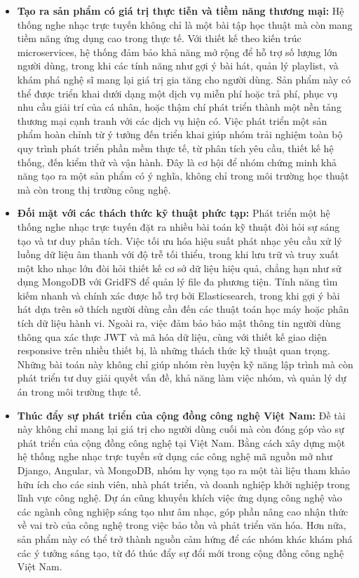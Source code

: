 \documentclass[a4paper,12pt]{report}
\begin{document}
\begin{itemize}
    \item \textbf{Tạo ra sản phẩm có giá trị thực tiễn và tiềm năng thương mại:}
    Hệ thống nghe nhạc trực tuyến không chỉ là một bài tập học thuật mà còn mang tiềm năng ứng dụng cao trong thực tế. Với thiết kế theo kiến trúc microservices, hệ thống đảm bảo khả năng mở rộng để hỗ trợ số lượng lớn người dùng, trong khi các tính năng như gợi ý bài hát, quản lý playlist, và khám phá nghệ sĩ mang lại giá trị gia tăng cho người dùng. Sản phẩm này có thể được triển khai dưới dạng một dịch vụ miễn phí hoặc trả phí, phục vụ nhu cầu giải trí của cá nhân, hoặc thậm chí phát triển thành một nền tảng thương mại cạnh tranh với các dịch vụ hiện có. Việc phát triển một sản phẩm hoàn chỉnh từ ý tưởng đến triển khai giúp nhóm trải nghiệm toàn bộ quy trình phát triển phần mềm thực tế, từ phân tích yêu cầu, thiết kế hệ thống, đến kiểm thử và vận hành. Đây là cơ hội để nhóm chứng minh khả năng tạo ra một sản phẩm có ý nghĩa, không chỉ trong môi trường học thuật mà còn trong thị trường công nghệ.

    \item \textbf{Đối mặt với các thách thức kỹ thuật phức tạp:}
    Phát triển một hệ thống nghe nhạc trực tuyến đặt ra nhiều bài toán kỹ thuật đòi hỏi sự sáng tạo và tư duy phân tích. Việc tối ưu hóa hiệu suất phát nhạc yêu cầu xử lý luồng dữ liệu âm thanh với độ trễ tối thiểu, trong khi lưu trữ và truy xuất một kho nhạc lớn đòi hỏi thiết kế cơ sở dữ liệu hiệu quả, chẳng hạn như sử dụng MongoDB với GridFS để quản lý file đa phương tiện. Tính năng tìm kiếm nhanh và chính xác được hỗ trợ bởi Elasticsearch, trong khi gợi ý bài hát dựa trên sở thích người dùng cần đến các thuật toán học máy hoặc phân tích dữ liệu hành vi. Ngoài ra, việc đảm bảo bảo mật thông tin người dùng thông qua xác thực JWT và mã hóa dữ liệu, cùng với thiết kế giao diện responsive trên nhiều thiết bị, là những thách thức kỹ thuật quan trọng. Những bài toán này không chỉ giúp nhóm rèn luyện kỹ năng lập trình mà còn phát triển tư duy giải quyết vấn đề, khả năng làm việc nhóm, và quản lý dự án trong môi trường thực tế.

    \item \textbf{Thúc đẩy sự phát triển của cộng đồng công nghệ Việt Nam:}
    Đề tài này không chỉ mang lại giá trị cho người dùng cuối mà còn đóng góp vào sự phát triển của cộng đồng công nghệ tại Việt Nam. Bằng cách xây dựng một hệ thống nghe nhạc trực tuyến sử dụng các công nghệ mã nguồn mở như Django, Angular, và MongoDB, nhóm hy vọng tạo ra một tài liệu tham khảo hữu ích cho các sinh viên, nhà phát triển, và doanh nghiệp khởi nghiệp trong lĩnh vực công nghệ. Dự án cũng khuyến khích việc ứng dụng công nghệ vào các ngành công nghiệp sáng tạo như âm nhạc, góp phần nâng cao nhận thức về vai trò của công nghệ trong việc bảo tồn và phát triển văn hóa. Hơn nữa, sản phẩm này có thể trở thành nguồn cảm hứng để các nhóm khác khám phá các ý tưởng sáng tạo, từ đó thúc đẩy sự đổi mới trong cộng đồng công nghệ Việt Nam.


\end{itemize}
\end{document}
